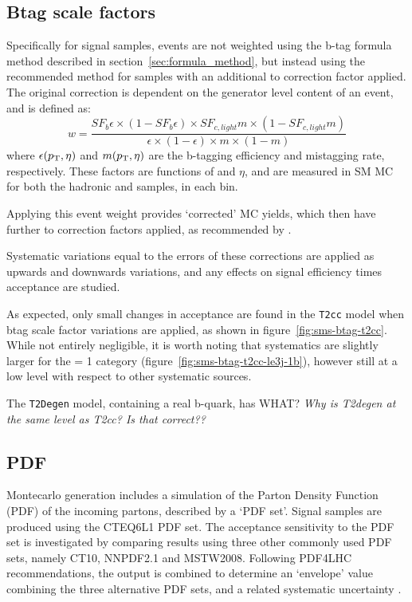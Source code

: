 \subsection{Btag scale factors}
Specifically for \FASTSIM signal samples, events are not weighted using the 
b-tag formula method described in section~\ref{sec:formula_method}, but instead
using the 
recommended method for \FULLSIM samples with an additional \FULLSIM to \FASTSIM 
correction factor applied. The original correction is dependent on the generator
level content of an event, and is defined as:
% 
\begin{equation}
w = \frac{SF_b \epsilon \times (1-SF_b \epsilon) \times SF_{c,light} m \times (1
-SF_{c,light} m)}{\epsilon \times (1-\epsilon) \times m \times (1-m)}
\label{eq:btag_fullsim_weight}
\end{equation}
% 
where $\epsilon({p_{\text T}}, \eta)$ and $m({p_{\text T}}, \eta)$ are the b-tagging efficiency and 
mistagging rate, respectively. These factors are functions of \Pt and $\eta$, and
are measured in SM MC for both the hadronic and \mj samples, in each \HT bin.

Applying this event weight provides `corrected' MC yields, which then 
have further \FASTSIM to \FULLSIM correction factors applied, as recommended by
\cite{btagpogtwiki}.

Systematic variations equal to the errors of these corrections are applied as 
upwards and downwards variations, and any effects on signal efficiency times 
acceptance are studied.

As expected, only small changes in acceptance are found in the \texttt{T2cc} 
model when btag scale factor variations are applied, as shown in
figure~\ref{fig:sms-btag-t2cc}. While not entirely negligible, it is worth 
noting that systematics are slightly larger for the \nb= 1 category
(figure~\ref{fig:sms-btag-t2cc-le3j-1b}), however still at a low level with 
respect to other systematic sources.

The \texttt{T2Degen} model, containing a real b-quark, has WHAT?
\emph{Why is T2degen at the same level as T2cc? Is that correct??}


\subsection{PDF}
Montecarlo generation includes a simulation of the Parton Density Function (PDF) 
of the incoming partons, described by a `PDF set'. Signal samples are produced
using the \textsc{CTEQ6L1} PDF set. The acceptance 
sensitivity to the PDF set is investigated by comparing results using three
other commonly used PDF sets, namely \textsc{CT10}, \textsc{NNPDF2.1} and
\textsc{MSTW2008}. Following PDF4LHC recommendations, the output is 
combined to determine an `envelope' value combining the three alternative PDF 
sets, and a related systematic uncertainty \cite{pdf4lhc}.

